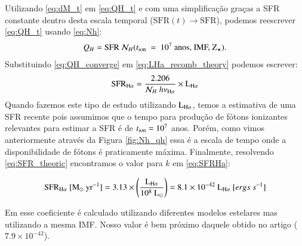 Utilizando \eqref{eq:dM_t} em \eqref{eq:QH_t} e com uma simplificação graças a SFR constante dentro desta escala temporal ($\mathrm{SFR}(t)\rightarrow \mathrm{SFR}$), podemos reescrever \eqref{eq:QH_t} usando \eqref{eq:Nh}:
\begin{equation}
	Q_H = \mathrm{SFR}\ \mathcal{N}_H(t_{\rm ion}\ =\ 10^7\ \textrm{anos, IMF, Z}{}_\star).
	\label{eq:QH_converge}
\end{equation}
\noindent Substituindo \eqref{eq:QH_converge} em \eqref{eq:LHa_recomb_theory} podemos escrever:
\begin{equation}
	\mathrm{SFR}_{\Ha} = \frac{2.206}{\mathcal{N}_H\ h \nu_{\Ha}} \times \LHalpha
	\label{eq:SFR_theoric}
\end{equation}
\noindent
Quando fazemos este tipo de estudo utilizando $\LHalpha$, temos a estimativa de uma SFR recente pois assumimos que o tempo para produção de fótons ionizantes relevantes para estimar a SFR é de $t_{\rm ion} = 10^7$ anos. Porém, como vimos anteriormente através da Figura \ref{fig:Nh_qh} essa é a escala de tempo onde a disponibilidade de fótons é praticamente máxima. Finalmente, resolvendo \eqref{eq:SFR_theoric} encontramos o valor para $k$ em \eqref{eq:SFRHa}:

\begin{equation}
	\mathrm{SFR}_{\Ha}\ [\mathrm{M}_\odot\ \mathrm{yr}^{-1}] = 3.13 \times
	\left(\frac{\LHalpha}{10^8\ \mathrm{L}_\odot}\right) = 8.1 \times 10^{-42}\ \LHalpha\ [ergs\ s^{-1}]
	\label{eq:SFRNeb}
\end{equation}

Em \citet{Kennicutt.1998a} esse coeficiente é calculado utilizando diferentes modelos estelares mas utilizando a mesma IMF. Nosso valor é bem próximo daquele obtido no artigo ($7.9 \times 10^{-42}$).

